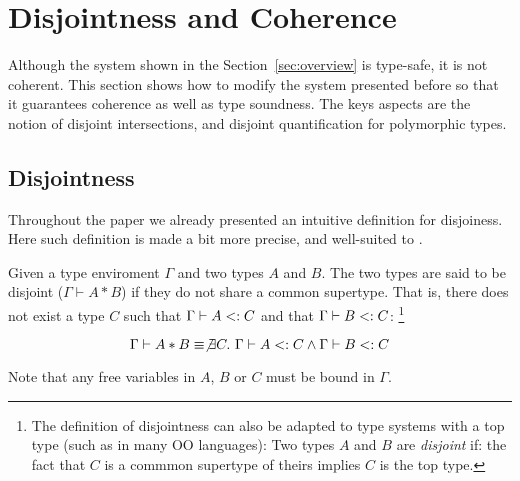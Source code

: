 \section{Disjointness and Coherence}
\label{sec:disjoint}

Although the system shown in the Section~\ref{sec:overview} is
type-safe, it is not coherent. This section shows how to modify the
system presented before so that it guarantees coherence as well as
type soundness. The keys aspects are the notion of disjoint
intersections, and disjoint quantification for polymorphic types.

%
%
%


\subsection{Disjointness} Throughout the paper we already presented an intuitive  
definition for disjoiness. Here such definition is made a bit more precise, and 
well-suited to \name. 

\begin{definition}
  Given a type enviroment $\Gamma$ and two types $A$ and $B$. The two types are said to be disjoint
  ($\Gamma \vdash A * B$) if they do not share a common supertype. That is, there does not exist a 
  type $C$ such that $\Gamma \vdash A <: C$
  and that $\Gamma \vdash B <: C$: \footnote{
  The definition of disjointness can also be adapted to type systems with a top
  type (such as \lstinline@Object@ in many OO languages): Two types $A$ and $B$
  are \emph{disjoint} if: the fact that $C$ is a commmon supertype of theirs
  implies $C$ is the top type.
  }

\[\Gamma \vdash A * B \equiv \not\exists C.~\Gamma \vdash A <: C \wedge \Gamma \vdash B <: C\]

\noindent Note that any free variables in $A$, $B$ or $C$ must be bound in $\Gamma$.

\end{definition}

